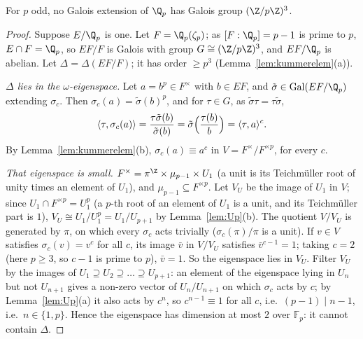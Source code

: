 \begin{proposition}\label{prop:nop3}
For $p$ odd, no Galois extension of $\Q_p$ has Galois group $(\Z/p\Z)^3$.
\end{proposition}
\begin{proof}
Suppose $E/\Q_p$ is one. Let $F=\Q_p(\zeta_p)$; as $[F:\Q_p]=p-1$ is prime to $p$, $E\cap F=\Q_p$, so $EF/F$ is Galois with group
$G\cong(\Z/p\Z)^3$, and $EF/\Q_p$ is abelian. Let $\Delta=\Delta(EF/F)$; it has order $\ge p^3$ (Lemma~\ref{lem:kummerelem}(a)).

\emph{$\Delta$ lies in the $\omega$-eigenspace.} Let $a=b^p\in F^\times$ with $b\in EF$, and $\tilde\sigma\in\operatorname{Gal}(EF/\Q_p)$ extending $\sigma_c$. Then
$\sigma_c(a)=\tilde\sigma(b)^p$, and for $\tau\in G$, as $\tilde\sigma\tau=\tau\tilde\sigma$,
\[
\langle\tau,\sigma_c(a)\rangle=\frac{\tau\tilde\sigma(b)}{\tilde\sigma(b)}=\tilde\sigma\Bigl(\frac{\tau(b)}b\Bigr)=\langle\tau,a\rangle^c.
\]
By Lemma~\ref{lem:kummerelem}(b), $\sigma_c(a)\equiv a^c$ in $V=F^\times/F^{\times p}$, for every $c$.

\emph{That eigenspace is small.} $F^\times=\pi^\Z\times\mu_{p-1}\times U_1$ (a unit is its Teichm\"uller root of unity times an element of $U_1$),
and $\mu_{p-1}\subseteq F^{\times p}$. Let $V_U$ be the image of $U_1$ in $V$; since $U_1\cap F^{\times p}=U_1^p$ (a $p$-th root of an element of $U_1$ is
a unit, and its Teichm\"uller part is $1$), $V_U\cong U_1/U_1^p=U_1/U_{p+1}$ by Lemma~\ref{lem:Up}(b). The quotient $V/V_U$ is generated by $\pi$, on
which every $\sigma_c$ acts trivially ($\sigma_c(\pi)/\pi$ is a unit). If $v\in V$ satisfies $\sigma_c(v)=v^c$ for all $c$, its image $\bar v$ in $V/V_U$
satisfies $\bar v^{c-1}=1$; taking $c=2$ (here $p\ge3$, so $c-1$ is prime to $p$), $\bar v=1$. So the eigenspace lies in $V_U$. Filter $V_U$ by the
images of $U_1\supseteq U_2\supseteq\dots\supseteq U_{p+1}$: an element of the eigenspace lying in $U_n$ but not $U_{n+1}$ gives a non-zero vector
of $U_n/U_{n+1}$ on which $\sigma_c$ acts by $c$; by Lemma~\ref{lem:Up}(a) it also acts by $c^n$, so $c^{n-1}\equiv1$ for all $c$, i.e.\
$(p-1)\mid n-1$, i.e.\ $n\in\{1,p\}$. Hence the eigenspace has dimension at most $2$ over $\mathbb F_p$: it cannot contain $\Delta$.
\end{proof}

